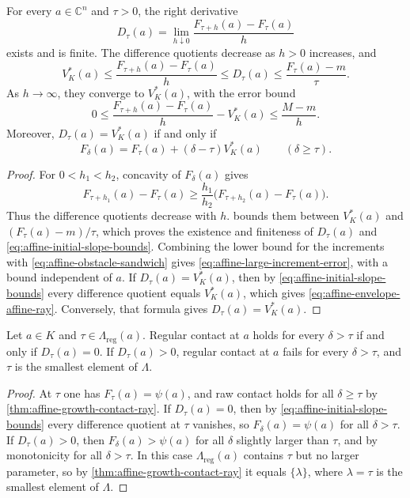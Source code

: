 \begin{proposition}\label{prop:affine-envelope-slopes}
For every $a\in\mathbb C^n$ and $\tau>0$, the right derivative
\[
 D_\tau(a)=\lim_{h\downarrow0}\frac{F_{\tau+h}(a)-F_\tau(a)}{h}
\]
exists and is finite. The difference quotients decrease as $h>0$ increases, and
\begin{equation}\label{eq:affine-initial-slope-bounds}
 V_K^*(a)\leq\frac{F_{\tau+h}(a)-F_\tau(a)}h
 \leq D_\tau(a)\leq\frac{F_\tau(a)-m}{\tau}.
\end{equation}
As $h\to\infty$, they converge to $V_K^*(a)$, with the error bound
\begin{equation}\label{eq:affine-large-increment-error}
 0\leq\frac{F_{\tau+h}(a)-F_\tau(a)}h-V_K^*(a)
 \leq\frac{M-m}h.
\end{equation}
Moreover, $D_\tau(a)=V_K^*(a)$ if and only if
\begin{equation}\label{eq:affine-envelope-affine-ray}
 F_\delta(a)=F_\tau(a)+(\delta-\tau)V_K^*(a)
 \qquad(\delta\geq\tau).
\end{equation}
\end{proposition}
\begin{proof}
For $0<h_1<h_2$, concavity of $F_\delta(a)$ gives
\[
 F_{\tau+h_1}(a)-F_\tau(a)
 \geq\frac{h_1}{h_2}\bigl(F_{\tau+h_2}(a)-F_\tau(a)\bigr).
\]
Thus the difference quotients decrease with $h$.  bounds them between $V_K^*(a)$ and $(F_\tau(a)-m)/\tau$, which proves the existence and finiteness of $D_\tau(a)$ and \eqref{eq:affine-initial-slope-bounds}. Combining the lower bound for the increments with \eqref{eq:affine-obstacle-sandwich} gives \eqref{eq:affine-large-increment-error}, with a bound independent of $a$. If $D_\tau(a)=V_K^*(a)$, then by \eqref{eq:affine-initial-slope-bounds} every difference quotient equals $V_K^*(a)$, which gives \eqref{eq:affine-envelope-affine-ray}. Conversely, that formula gives $D_\tau(a)=V_K^*(a)$.
\end{proof}

\begin{corollary}\label{cor:affine-slope-regular-contact}
Let $a\in K$ and $\tau\in\Lambda_{\mathrm{reg}}(a)$. Regular contact at $a$ holds for every $\delta>\tau$ if and only if $D_\tau(a)=0$. If $D_\tau(a)>0$, regular contact at $a$ fails for every $\delta>\tau$, and $\tau$ is the smallest element of $\Lambda$.
\end{corollary}
\begin{proof}
At $\tau$ one has $F_\tau(a)=\psi(a)$, and raw contact holds for all $\delta\geq\tau$ by \cref{thm:affine-growth-contact-ray}. If $D_\tau(a)=0$, then by \eqref{eq:affine-initial-slope-bounds} every difference quotient at $\tau$ vanishes, so $F_\delta(a)=\psi(a)$ for all $\delta>\tau$. If $D_\tau(a)>0$, then $F_\delta(a)>\psi(a)$ for all $\delta$ slightly larger than $\tau$, and by monotonicity for all $\delta>\tau$. In this case $\Lambda_{\mathrm{reg}}(a)$ contains $\tau$ but no larger parameter, so by \cref{thm:affine-growth-contact-ray} it equals $\{\lambda\}$, where $\lambda=\tau$ is the smallest element of $\Lambda$.
\end{proof}


